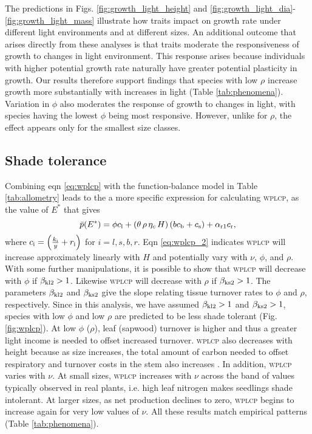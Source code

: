 \documentclass[9pt,twocolumn,twoside]{pnas-new}
\newcommand{\wplcp}{\textsc{wplcp}}
\begin{document}
The predictions in Figs. \ref{fig:growth_light_height} and \ref{fig:growth_light_dia}-\ref{fig:growth_light_mass} illustrate how traits impact on growth rate under different light environments and at different sizes. An additional outcome that arises directly from these analyses is that traits moderate the responsiveness of growth to changes in light environment. This response arises because individuals with higher potential growth rate naturally have greater potential plasticity in growth. Our results therefore support findings that species with low $\rho$ increase growth more substantially with increases in light (Table \ref{tab:phenomena}). Variation in $\phi$ also moderates the response of growth to changes in light, with species having the lowest $\phi$ being most responsive. However, unlike for $\rho$, the effect appears only for the smallest size classes.

\subsection{Shade tolerance}
Combining eqn \ref{eq:wplcp} with the function-balance model in Table \ref{tab:allometry} leads to the a more specific expression for calculating {\wplcp}, as the value of $E^*$ that gives
\begin{equation}\label{eq:wplcp_2}
\bar{p}(E^*) =
      \phi c_{\rm l} +
      \left(\theta \, \rho \, \eta_c \, H\right)
        \left(b c_{\rm b}
            + c_{\rm s}\right) +
      \alpha_{\rm r1} c_{\rm r},
\end{equation}
where $c_{\rm i} = \left(\frac{k_{\rm i}}{y} + r_{\rm i}\right)$ for $i=l,s,b,r$.
Eqn \ref{eq:wplcp_2} indicates {\wplcp} will increase approximately linearly with $H$ and potentially vary with $\nu$, $\phi$, and $\rho$. With some further manipulations, it is possible to show that {\wplcp} will decrease with $\phi$ if $\beta_{{\rm kl2}} >1$. Likewise {\wplcp} will decrease with $\rho$ if $\beta_{{\rm ks2}} >1$. The parameters $\beta_{{\rm kl2}}$ and $\beta_{{\rm ks2}}$ give the slope relating tissue turnover rates to $\phi$ and $\rho$, respectively. Since in this analysis, we have assumed $\beta_{{\rm kl2}} >1$ and $\beta_{{\rm ks2}} >1$, species with low $\phi$ and low $\rho$ are predicted to be less shade tolerant (Fig. \ref{fig:wplcp}). At low $\phi$ ($\rho$), leaf (sapwood) turnover is higher and thus a greater light income is needed to offset increased turnover. {\wplcp} also decreases with height because as size increases, the total amount of carbon needed to offset respiratory and turnover costs in the stem also increases \citep{Givnish-1988}. In addition, {\wplcp} varies with $\nu$. At small sizes, {\wplcp} increases with $\nu$ across the band of values typically observed in real plants, i.e. high leaf nitrogen makes seedlings shade intolerant. At larger sizes, as net production declines to zero, {\wplcp} begins to increase again for very low values of $\nu$. All these results  match empirical patterns (Table \ref{tab:phenomena}).
\end{document}
